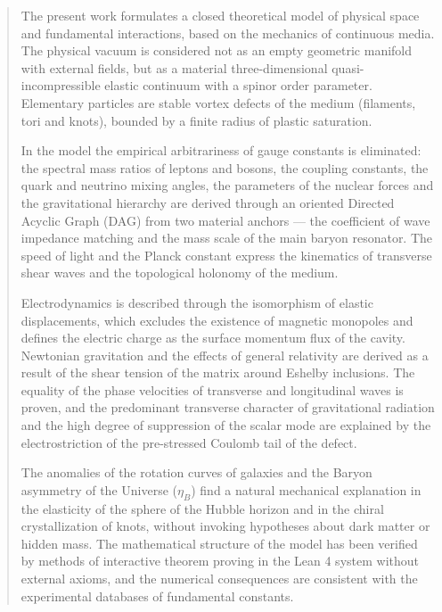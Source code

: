 \documentclass[11pt,a4paper]{article}
\theoremstyle{definition}
\theoremstyle{remark}
\begin{document}
\begin{abstract}
\noindent The present work formulates a closed theoretical model of physical space and fundamental interactions, based on the mechanics of continuous media. The physical vacuum is considered not as an empty geometric manifold with external fields, but as a material three-dimensional quasi-incompressible elastic continuum with a spinor order parameter. Elementary particles are stable vortex defects of the medium (filaments, tori and knots), bounded by a finite radius of plastic saturation.

In the model the empirical arbitrariness of gauge constants is eliminated: the spectral mass ratios of leptons and bosons, the coupling constants, the quark and neutrino mixing angles, the parameters of the nuclear forces and the gravitational hierarchy are derived through an oriented Directed Acyclic Graph (DAG) from two material anchors --- the coefficient of wave impedance matching and the mass scale of the main baryon resonator. The speed of light and the Planck constant express the kinematics of transverse shear waves and the topological holonomy of the medium.

Electrodynamics is described through the isomorphism of elastic displacements, which excludes the existence of magnetic monopoles and defines the electric charge as the surface momentum flux of the cavity. Newtonian gravitation and the effects of general relativity are derived as a result of the shear tension of the matrix around Eshelby inclusions. The equality of the phase velocities of transverse and longitudinal waves is proven, and the predominant transverse character of gravitational radiation and the high degree of suppression of the scalar mode are explained by the electrostriction of the pre-stressed Coulomb tail of the defect.

The anomalies of the rotation curves of galaxies and the Baryon asymmetry of the Universe ($\eta_B$) find a natural mechanical explanation in the elasticity of the sphere of the Hubble horizon and in the chiral crystallization of knots, without invoking hypotheses about dark matter or hidden mass. The mathematical structure of the model has been verified by methods of interactive theorem proving in the Lean 4 system without external axioms, and the numerical consequences are consistent with the experimental databases of fundamental constants.
\end{abstract}
	
\tableofcontents
\newpage
\end{document}
